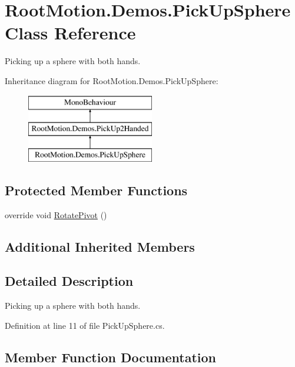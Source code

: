 \hypertarget{class_root_motion_1_1_demos_1_1_pick_up_sphere}{}\section{Root\+Motion.\+Demos.\+Pick\+Up\+Sphere Class Reference}
\label{class_root_motion_1_1_demos_1_1_pick_up_sphere}


Picking up a sphere with both hands.  


Inheritance diagram for Root\+Motion.\+Demos.\+Pick\+Up\+Sphere\+:\begin{figure}[H]
\begin{center}
\leavevmode
\includegraphics[height=3.000000cm]{class_root_motion_1_1_demos_1_1_pick_up_sphere}
\end{center}
\end{figure}
\subsection*{Protected Member Functions}
\begin{DoxyCompactItemize}
\item 
override void \mbox{\hyperlink{class_root_motion_1_1_demos_1_1_pick_up_sphere_a88380e1448b6e564dfb99a1dacf91571}{Rotate\+Pivot}} ()
\end{DoxyCompactItemize}
\subsection*{Additional Inherited Members}


\subsection{Detailed Description}
Picking up a sphere with both hands. 



Definition at line 11 of file Pick\+Up\+Sphere.\+cs.



\subsection{Member Function Documentation}
\mbox{\label{class_root_motion_1_1_demos_1_1_pick_up_sphere_a88380e1448b6e564dfb99a1dacf91571}} 
